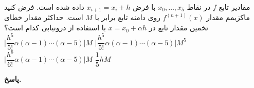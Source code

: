  مقادیر تابع 
\(f\)
 در نقاط
\(x_0, \ldots, x_5\)
با فرض
\(x_{i+1} = x_i + h\)
داده شده است. فرض کنید ماکزیمم مقدار 
\(f^{(n+1)} (x)\)
روی دامنه تابع برابر با 
\(M\)
است. حداکثر مقدار خطای تخمین مقدار تابع در 
\(x = x_0 + \alpha h\)
با استفاده از درونیابی کدام است؟
\mulchoice
	{\(\Big| \dfrac{h^5}{5!}\alpha(\alpha-1)\cdots (\alpha-5)\Big| M\)}
	{\(\Big| \dfrac{h^5}{5!}\alpha(\alpha-1)\cdots (\alpha-5)\Big| M^5\)}
	{\(\Big| \dfrac{h^6}{6!}\alpha(\alpha-1)\cdots (\alpha-5)\Big| M\)}
	{\(\dfrac{1}{5}hM\)}

\begin{answer}

	\textbf{پاسخ.}
	
\end{answer}
